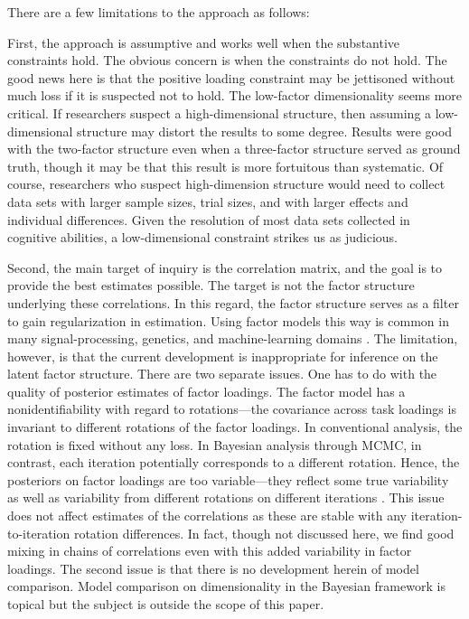 \documentclass[man, 12pt]{apa7} %
\begin{document}
There are a few limitations to the approach as follows: 

First, the approach is assumptive and works well when the substantive constraints hold.  The obvious concern is when the constraints do not hold.  The good news here is that the positive loading constraint may be jettisoned without much loss if it is suspected not to hold.  The low-factor dimensionality seems more critical.  If researchers suspect a high-dimensional structure, then assuming a low-dimensional structure may distort the results to some degree.  Results were good with the two-factor structure even when a three-factor structure served as ground truth, though it may be that this result is more fortuitous than systematic.  Of course, researchers who suspect high-dimension structure would need to collect data sets with larger sample sizes, trial sizes, and with larger effects and individual differences.  Given the resolution of most data sets collected in cognitive abilities, a low-dimensional constraint strikes us as judicious. 

Second, the main target of inquiry is the correlation matrix, and the goal is to provide the best estimates possible.  The target is not the factor structure underlying these correlations.  In this regard, the factor structure serves as a filter to gain regularization in estimation.  Using factor models this way is common in many signal-processing, genetics, and machine-learning domains \parencite[]{Du.etal.2023, Bhattacharya.Dunson.2011, Sanyal.Ferreira.2012}.   The limitation, however, is that the current development is inappropriate for inference on the latent factor structure.  There are two separate issues.  One has to do with the quality of posterior estimates of factor loadings.  The factor model has a nonidentifiability with regard to rotations---the covariance across task loadings is invariant to different rotations of the factor loadings.   In conventional analysis, the rotation is fixed without any loss.  In Bayesian analysis through MCMC, in contrast, each iteration potentially corresponds to a different rotation.   Hence, the posteriors on factor loadings are too variable---they reflect some true variability as well as variability from different rotations on different iterations \parencite[]{Poworoznek.etal.2021}.  This issue does not affect estimates of the correlations as these are stable with any iteration-to-iteration rotation differences.  In fact, though not discussed here, we find good mixing in chains of correlations even with this added variability in factor loadings.  The second issue is that there is no development herein of model comparison.  Model comparison on dimensionality in the Bayesian framework is topical \parencite[e.g.,][]{Oh.Kim.2010} but the subject is outside the scope of this paper.
\end{document}
